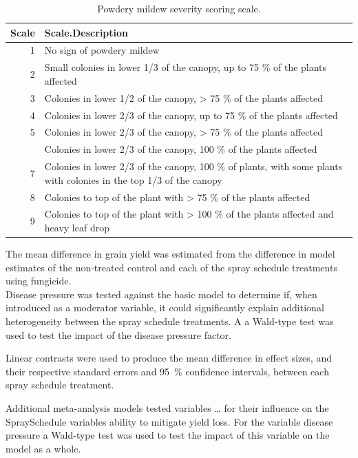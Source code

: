 \documentclass[agronomy,article,submit,moreauthors,pdftex]{mdpi}
\begin{document}
\begin{table}

\caption{\label{tab:Table2_1to9Scale}Powdery mildew severity scoring scale.}
\centering
\begin{tabular}[t]{rl}
\toprule
Scale & Scale.Description\\
\midrule
1 & No sign of powdery mildew\\
2 & Small colonies in lower 1/3 of the canopy, up to 75 \% of the plants affected\\
3 & Colonies in lower 1/2 of the canopy, > 75 \% of the plants affected\\
4 & Colonies in lower 2/3 of the canopy, up to 75 \% of the plants affected\\
5 & Colonies in lower 2/3 of the canopy, > 75 \% of the plants affected\\
\addlinespace
6 & Colonies in lower 2/3 of the canopy, 100 \% of the plants affected\\
7 & Colonies in lower 2/3 of the canopy, 100 \% of plants, with some plants with colonies in the top 1/3 of the canopy\\
8 & Colonies to top of the plant with > 75 \% of the plants affected\\
9 & Colonies to top of the plant with > 100 \% of the plants affected and heavy leaf drop\\
\bottomrule
\end{tabular}
\end{table}

The mean difference in grain yield was estimated from the difference in
model estimates of the non-treated control and each of the spray
schedule treatments using fungicide.\\
Disease pressure was tested against the basic model to determine if,
when introduced as a moderator variable, it could significantly explain
additional heterogeneity between the spray schedule treatments. A a
Wald-type test was used to test the impact of the disease pressure
factor.

Linear contrasts were used to produce the mean difference in effect
sizes, and their respective standard errors and 95~\% confidence
intervals, between each spray schedule treatment.

Additional meta-analysis models tested variables \ldots{} for their
influence on the SpraySchedule variables ability to mitigate yield loss.
For the variable disease pressure a Wald-type test was used to test the
impact of this variable on the model as a whole.
\end{document}
